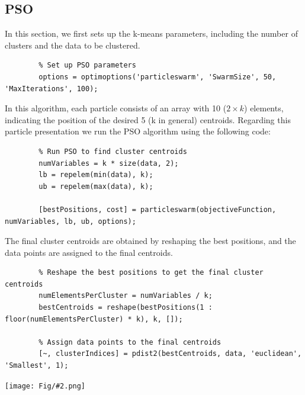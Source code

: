 \documentclass[]{article}
\newcommand{\pict}[2]{\begin{center}
		\texttt{[image: Fig/\#2.png]}
\end{center}}
\begin{document}
	\subsection{PSO}
	In this section, we first sets up the k-means parameters, including the number of clusters and the data to be clustered.
	\begin{lstlisting}
		% Set up PSO parameters
		options = optimoptions('particleswarm', 'SwarmSize', 50, 'MaxIterations', 100);
	\end{lstlisting}
	In this algorithm, each particle consists of an array with 10 ($2 \times k$) elements, indicating the position of the desired 5 (k in general) centroids. Regarding this particle presentation we run the PSO algorithm using the following code:
	\begin{lstlisting}
		% Run PSO to find cluster centroids
		numVariables = k * size(data, 2);
		lb = repelem(min(data), k);
		ub = repelem(max(data), k);
		
		[bestPositions, cost] = particleswarm(objectiveFunction, numVariables, lb, ub, options);
	\end{lstlisting}
	The final cluster centroids are obtained by reshaping the best positions, and the data points are assigned to the final centroids.
	\begin{lstlisting}
		% Reshape the best positions to get the final cluster centroids
		numElementsPerCluster = numVariables / k;
		bestCentroids = reshape(bestPositions(1 : floor(numElementsPerCluster) * k), k, []);
		
		% Assign data points to the final centroids
		[~, clusterIndices] = pdist2(bestCentroids, data, 'euclidean', 'Smallest', 1);
	\end{lstlisting}
	\pict{0.4}{F21}
	
\end{document}
